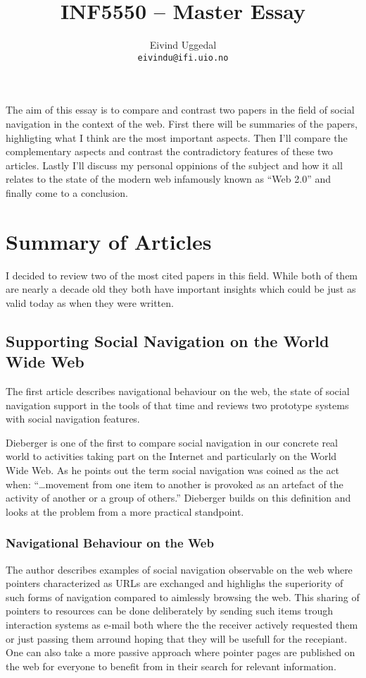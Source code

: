 \documentclass[12pt,a4paper]{article}
\author{Eivind Uggedal\\
  \texttt{eivindu@ifi.uio.no}}
\title{INF5550 -- Master Essay}
\begin{document}
\maketitle{}

The aim of this essay is to compare and contrast two papers in the field of
social navigation in the context of the web. First there will be summaries
of the papers, highligting what I think are the most important aspects.
Then I'll compare the complementary aspects and contrast the contradictory
features of these two articles. Lastly I'll discuss my personal
oppinions of the subject and how it all relates to the state of the modern web
infamously known as ``Web 2.0'' and finally come to a conclusion.

\section{Summary of Articles}

I decided to review two of the most cited papers in this field. While both of
them are nearly a decade old they both have important insights which could be
just as valid today as when they were written.

\subsection{Supporting Social Navigation on the World Wide Web}
The first article \cite{dieberger97} describes navigational behaviour on the
web, the state of social navigation support in the tools of that time and
reviews two prototype systems with social navigation features.

Dieberger is one of the first to compare social navigation in our concrete
real world to activities taking part on the Internet and particularly on the
World Wide Web. As he points out the term social navigation was coined as the
act when:
``\ldots movement from one item to another is provoked as an artefact of the
activity of another or a group of others.'' \cite{dourish94} Dieberger builds
on this definition and looks at the problem from a more practical standpoint.

\subsubsection{Navigational Behaviour on the Web}

The author describes examples of social navigation observable on the web where
pointers characterized as URLs are exchanged and highlighs the superiority of
such forms of navigation compared to aimlessly browsing the web. This sharing
of pointers to resources can be done deliberately by sending such
items trough interaction systems as e-mail both where the the receiver
actively requested them or just passing them arround hoping that they
will be usefull for the recepiant. One can also take a more passive approach
where pointer pages are published on the web for everyone to benefit from in
their search for relevant information.
\end{document}
